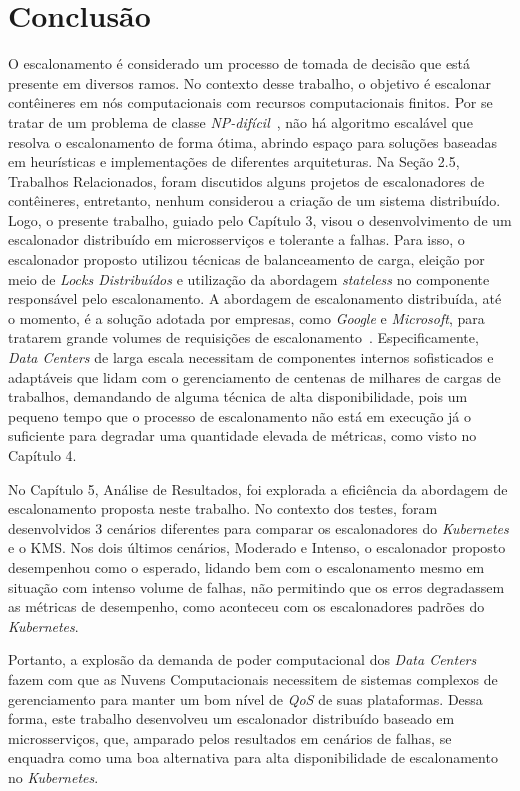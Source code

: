 \chapter{Conclusão}

O escalonamento é considerado um processo de tomada de decisão que está presente em diversos ramos. No contexto desse trabalho, o objetivo é escalonar contêineres em nós computacionais com recursos computacionais finitos. 
Por se tratar de um problema de classe \textit{NP-difícil}~\cite{ullman1975np}, não há algoritmo escalável que resolva o escalonamento de forma ótima, abrindo espaço para soluções baseadas em heurísticas e implementações de diferentes arquiteturas. Na Seção 2.5, Trabalhos Relacionados, foram discutidos alguns projetos de escalonadores de contêineres, entretanto, nenhum considerou a criação de um sistema distribuído. Logo, o presente trabalho, guiado pelo Capítulo 3, visou o desenvolvimento de um escalonador distribuído em microsserviços e tolerante a falhas. Para isso, o escalonador proposto utilizou técnicas de balanceamento de carga, eleição por meio de \textit{Locks Distribuídos} e utilização da abordagem \textit{stateless} no componente responsável pelo escalonamento.  A abordagem de escalonamento distribuída, até o momento, é a solução adotada por empresas, como \textit{Google} e \textit{Microsoft}, para tratarem grande volumes de requisições de escalonamento~\cite{Wang2019Pigeon, Google2015Borg}. 
Especificamente, \textit{Data Centers} de larga escala necessitam de componentes internos sofisticados e adaptáveis que lidam com o gerenciamento de centenas de milhares de cargas de trabalhos, demandando de alguma técnica de alta disponibilidade, pois um pequeno tempo que o processo de escalonamento não está em execução já o suficiente para degradar uma quantidade elevada de métricas, como visto no Capítulo 4.

No Capítulo 5, Análise de Resultados, foi explorada a eficiência da abordagem de escalonamento proposta neste trabalho. No contexto dos testes, foram desenvolvidos 3 cenários diferentes para comparar os escalonadores do \textit{Kubernetes} e o \ac{KMS}. Nos dois últimos cenários, Moderado e Intenso, o escalonador proposto desempenhou como o esperado, lidando bem com o escalonamento mesmo em situação com intenso volume de falhas, não permitindo que os erros degradassem as métricas de desempenho, como aconteceu com os escalonadores padrões do \textit{Kubernetes}.

Portanto, a explosão da demanda de poder computacional dos \textit{Data Centers} fazem com que as Nuvens Computacionais necessitem de sistemas complexos de gerenciamento para manter um bom nível de \textit{QoS} de suas plataformas. Dessa forma, este trabalho desenvolveu um escalonador distribuído baseado em microsserviços, que, amparado pelos resultados em cenários de falhas, se enquadra como uma boa alternativa para alta disponibilidade de escalonamento no \textit{Kubernetes}.

